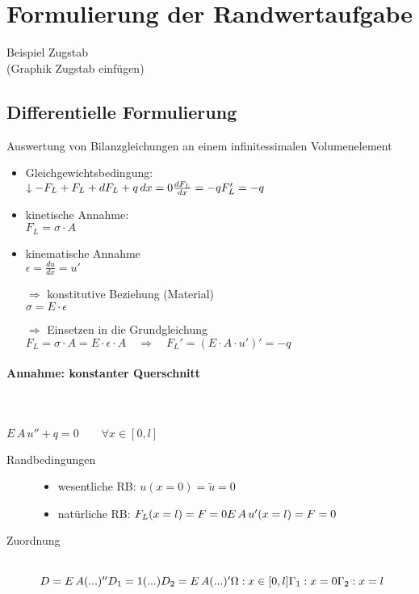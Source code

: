 \section{Formulierung der Randwertaufgabe}
Beispiel Zugstab\\
(Graphik Zugstab einfügen)\\
\subsection{Differentielle Formulierung}
Auswertung von Bilanzgleichungen an einem infinitessimalen Volumenelement\\
\begin{itemize}
\item Gleichgewichtsbedingung: \\
\(\downarrow -F_L + F_L + dF_L + q\,dx = 0 \\\\ \frac{dF_L}{dx} = -q \\\\ F_L' = -q\)

\item kinetische Annahme:\\
	\(F_L = \sigma \cdot A \)
	
\item kinematische Annahme\\
	\(\epsilon = \frac{du}{dx} = u'\)
	
\item[$\Rightarrow$] konstitutive Beziehung (Material)\\
	\(\sigma = E \cdot \epsilon\)
	
\item[$\Rightarrow$] Einsetzen in die Grundgleichung\\
	\(F_L = \sigma \cdot A = E \cdot \epsilon \cdot A \quad \Rightarrow \quad F_L' = (E \cdot A \cdot u')' = -q\)
\end{itemize}
\paragraph{Annahme: konstanter Querschnitt}\hfill\\\\
\(E\,A\,u'' + q = 0 \qquad \forall x \in [0,l]\)

\begin{description}
	\item[Randbedingungen]\hfill
		\begin{itemize}
		\item wesentliche RB: \(u(x=0) = \tilde{u} = 0 \)
		\item natürliche RB: \(F_L (x=l) = F = 0 \\ E\,A\,u' (x=l) = F = 0\)
		\end{itemize}
	\item[Zuordnung]\hfill\\
			\(D = E\,A (...)'' \\
			D_1 = 1 (...) \\
			D_2 = E\,A(...)' \\
			\Omega : x \in [0, l] \\
			\Gamma_1 : x = 0 \\
			\Gamma_2 : x = l \)
\end{description}

